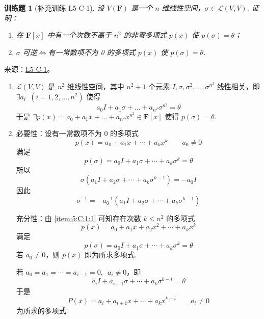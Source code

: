 \documentclass[12pt,fontset=fandol]{ctexart}
\newtheorem{exercise}{训练题}[section]
\begin{document}
\begin{exercise}[补充训练 L5-C-1]\label{prob:L5-C-1}
设 $V(\mathbf{F})$ 是一个 $n$ 维线性空间，$\sigma \in \mathcal{L}(V,V)$. 证明：
        \begin{enumerate}
            \item 在 $\mathbf{F}[x]$ 中有一个次数不高于 $n^2$ 的非零多项式 $p(x)$ 使 $p(\sigma) = \theta$；

            \item $\sigma$ 可逆$\iff$有一常数项不为 0 的多项式 $p(x)$ 使 $p(\sigma) = \theta$.
        \end{enumerate}
\end{exercise}
\noindent 来源：\href{https://github.com/yhwu-is/Linear-Algebra-Left-Undone/blob/new/%E8%AE%B2%E4%B9%89/%E4%B8%93%E9%A2%98/5%20%E7%BA%BF%E6%80%A7%E6%98%A0%E5%B0%84.tex}{L5-C-1}。
\begin{solve}
\begin{enumerate}
                \item \label{item:5:C:1:1}
                      $ \mathcal{L}(V, V) $ 是 $ n^2 $ 维线性空间，其中 $ n^2 + 1 $ 个元素 $ I, \sigma, \sigma^2, \ldots, \sigma^{n^2} $ 线性相关，即 $ \exists a_i\enspace (i = 1, 2, \ldots, n^2) $ 使得
                      \[ a_0 I + a_1 \sigma + \ldots + a_{n^2} \sigma^{n^2} = \theta \]
                      于是 $ \exists p(x) = a_0 + a_1 x + \ldots + a_{n^2} x^{n^2} \in \mathbf{F}[x] $ 使得 $ p(\sigma) = \theta $.

                \item 必要性：设有一常数项不为 0 的多项式
                      \[ p(x) = a_0 + a_1 x + \cdots + a_k x^k \qquad a_0 \neq 0 \]
                      满足
                      \[ p(\sigma) = a_0 I + a_1 \sigma + \cdots + a_k \sigma^k = \theta \]
                      所以
                      \[ \sigma(a_1 I + a_2 \sigma + \cdots + a_k \sigma^{k - 1}) = -a_0 I \]
                      因此
                      \[ \sigma^{-1} = -a_0^{-1} (a_1 I + a_2 \sigma + \cdots + a_k \sigma^{k - 1}) \]

                      充分性：由 \eqref{item:5:C:1:1} 可知存在次数 $ k \leqslant n^2 $ 的多项式
                      \[ p(x) = a_0 + a_1 x + a_2 x^2 + \cdots + a_k x^k \]
                      满足
                      \[ p(\sigma) = a_0 I + a_1 \sigma + \cdots + a_k \sigma^k = \theta \]
                      若 $ a_0 \neq 0 $，则 $ p(x) $ 即为所求多项式.

                      若 $ a_0 = a_1 = \cdots = a_{i - 1} = 0,\enspace a_i \neq 0 $，即
                      \[ a_i I + a_{i + 1} \sigma + \cdots + a_k \sigma^{k - i} = \theta \]
                      于是
                      \[ P(x) = a_i + a_{i + 1} x + \cdots + a_k x^{k - i} \qquad a_i \neq 0 \]
                      为所求的多项式.
            \end{enumerate}
\end{solve}
\end{document}
